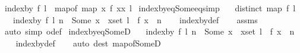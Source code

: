\begin{isabellebody}
\isanewline
{}\isamarkupfalse%
\ {\isachardoublequoteopen}index{\isacharunderscore}{\kern0pt}by\ f\ l\ {\isasymequiv}\ map{\isacharunderscore}{\kern0pt}of\ {\isacharparenleft}{\kern0pt}map\ {\isacharparenleft}{\kern0pt}{\isasymlambda}x{\isachardot}{\kern0pt}\ {\isacharparenleft}{\kern0pt}f\ x{\isacharcomma}{\kern0pt}x{\isacharparenright}{\kern0pt}{\isacharparenright}{\kern0pt}\ l{\isacharparenright}{\kern0pt}{\isachardoublequoteclose}\isanewline
\isanewline
{}\isamarkupfalse%
\ index{\isacharunderscore}{\kern0pt}by{\isacharunderscore}{\kern0pt}eq{\isacharunderscore}{\kern0pt}Some{\isacharunderscore}{\kern0pt}eq{\isacharbrackleft}{\kern0pt}simp{\isacharbrackright}{\kern0pt}{\isacharcolon}{\kern0pt}\isanewline
\ \ \ {\isachardoublequoteopen}distinct\ {\isacharparenleft}{\kern0pt}map\ f\ l{\isacharparenright}{\kern0pt}{\isachardoublequoteclose}\isanewline
\ \ \ {\isachardoublequoteopen}index{\isacharunderscore}{\kern0pt}by\ f\ l\ n\ {\isacharequal}{\kern0pt}\ Some\ x\ {\isasymlongleftrightarrow}\ {\isacharparenleft}{\kern0pt}x{\isasymin}set\ l\ {\isasymand}\ f\ x\ {\isacharequal}{\kern0pt}\ n{\isacharparenright}{\kern0pt}{\isachardoublequoteclose}\isanewline
%
\isadelimproof
\ \ %
\endisadelimproof
%
\isatagproof
{}\isamarkupfalse%
\ index{\isacharunderscore}{\kern0pt}by{\isacharunderscore}{\kern0pt}def\isanewline
\ \ \isamarkupfalse%
\ assms\isanewline
\ \ \isamarkupfalse%
\ {\isacharparenleft}{\kern0pt}auto\ simp{\isacharcolon}{\kern0pt}\ o{\isacharunderscore}{\kern0pt}def{\isacharparenright}{\kern0pt}%
\endisatagproof
{\isafoldproof}%
%
\isadelimproof
\isanewline
%
\endisadelimproof
\isanewline
{}\isamarkupfalse%
\ index{\isacharunderscore}{\kern0pt}by{\isacharunderscore}{\kern0pt}eq{\isacharunderscore}{\kern0pt}SomeD{\isacharcolon}{\kern0pt}\isanewline
\ \ \ {\isachardoublequoteopen}index{\isacharunderscore}{\kern0pt}by\ f\ l\ n\ {\isacharequal}{\kern0pt}\ Some\ x\ {\isasymLongrightarrow}\ {\isacharparenleft}{\kern0pt}x{\isasymin}set\ l\ {\isasymand}\ f\ x\ {\isacharequal}{\kern0pt}\ n{\isacharparenright}{\kern0pt}{\isachardoublequoteclose}\isanewline
%
\isadelimproof
\ \ %
\endisadelimproof
%
\isatagproof
{}\isamarkupfalse%
\ index{\isacharunderscore}{\kern0pt}by{\isacharunderscore}{\kern0pt}def\isanewline
\ \ \isamarkupfalse%
\ {\isacharparenleft}{\kern0pt}auto\ dest{\isacharcolon}{\kern0pt}\ map{\isacharunderscore}{\kern0pt}of{\isacharunderscore}{\kern0pt}SomeD{\isacharparenright}{\kern0pt}%

\end{isabellebody}
